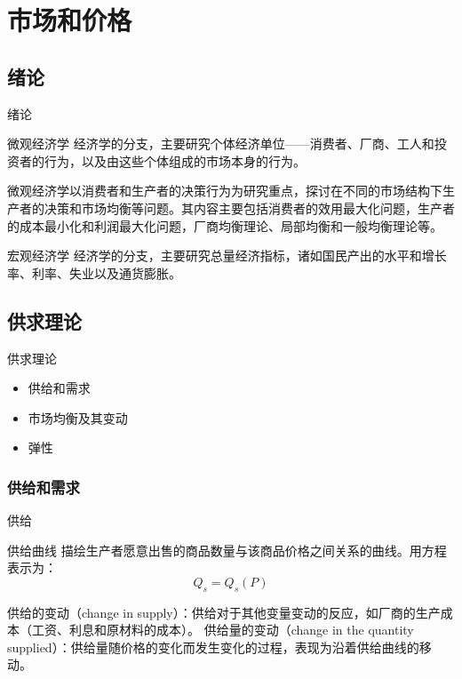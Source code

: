 \documentclass[UTF8]{ctexbeamer}
\begin{document}
\section{市场和价格}

\subsection{绪论}
\begin{frame}{绪论}
\begin{block}{微观经济学}
经济学的分支，主要研究个体经济单位——消费者、厂商、工人和投资者的行为，以及由这些个体组成的市场本身的行为。

微观经济学以消费者和生产者的决策行为为研究重点，探讨在不同的市场结构下生产者的决策和市场均衡等问题。其内容主要包括消费者的效用最大化问题，生产者的成本最小化和利润最大化问题，厂商均衡理论、局部均衡和一般均衡理论等。

\end{block}
\begin{block}{宏观经济学}
经济学的分支，主要研究总量经济指标，诸如国民产出的水平和增长率、利率、失业以及通货膨胀。
\end{block}
\end{frame}

\subsection{供求理论}
\begin{frame}{供求理论}
\linespread{1.5}
\begin{itemize}
\item 供给和需求
\item 市场均衡及其变动
\item 弹性
\end{itemize}
\end{frame}

\subsubsection{供给和需求}
\begin{frame}{供给}
\begin{block}{供给曲线}
描绘生产者愿意出售的商品数量与该商品价格之间关系的曲线。\newline 用方程表示为：
\begin{equation*}
Q_s = Q_s(P) 
\end{equation*}
\end{block}

供给的变动（change in supply）：供给对于其他变量变动的反应，如厂商的生产成本（工资、利息和原材料的成本）。  \newline
供给量的变动（change in the quantity supplied）：供给量随价格的变化而发生变化的过程，表现为沿着供给曲线的移动。
\end{frame}
\end{document}
